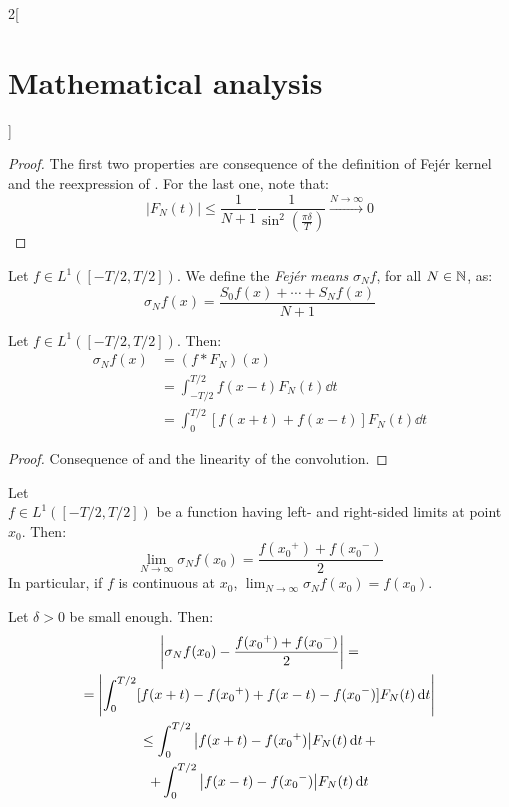 \documentclass[../../../main_math.tex]{subfiles}
\begin{document}
\begin{multicols}{2}[\section{Mathematical analysis}]
\begin{proposition}
  \end{proposition}
  \begin{proof}
    The first two properties are consequence of the definition of Fejér kernel and the reexpression of . For the last one, note that:
    $$|F_N(t)|\leq \frac{1}{N+1}\frac{1}{\sin^2\left(\frac{\pi \delta}{T}\right)}\overset{N\to\infty}{\longrightarrow} 0$$
  \end{proof}
  \begin{definition}
    Let $f\in L^1([-T/2,T/2])$. We define the \emph{Fejér means} $\sigma_Nf$, for all $N\in\mathbb{N} $, as:
    \begin{equation}\label{MA:fejermeans}
      \sigma_Nf(x)=\frac{S_0f(x)+\cdots+S_Nf(x)}{N+1}
    \end{equation}
  \end{definition}
  \begin{proposition}
    Let $f\in L^1([-T/2,T/2])$. Then:
    \begin{align*}
      \sigma_Nf(x) & =(f*F_N)(x)                              \\
                   & =\int_{-T/2}^{T/2}f(x-t)F_N(t)\dd{t}     \\
                   & =\int_0^{T/2}[f(x+t)+f(x-t)]F_N(t)\dd{t}
    \end{align*}
  \end{proposition}
  \begin{proof}
    Consequence of  and the linearity of the convolution.
  \end{proof}
  \begin{theorem}\label{MA:fejerthm0}
    Let \\$f\in L^1([-T/2,T/2])$ be a function having left- and right-sided limits at point $x_0$. Then: $$\lim_{N\to\infty}\sigma_Nf(x_0)=\frac{f({x_0}^+)+f({x_0}^-)}{2}$$ In particular, if $f$ is continuous at $x_0$, $\displaystyle\lim_{N\to\infty}\sigma_Nf(x_0)=f(x_0).$
  \end{theorem}
  \begin{sproof}
    Let $\delta>0$ be small enough. Then:
    \begin{multline*}
      \abs{\sigma_Nf(x_0)-\frac{f({x_0}^+)+f({x_0}^-)}{2}}=\\
      =\abs{\int_0^{T/2}[f(x+t)-f({x_0}^+)+f(x-t)-f({x_0}^-)]F_N(t)\dd{t}} \\
      \leq \int_0^{T/2}\abs{f(x+t)-f({x_0}^+)}F_N(t)\dd{t}+\\+\int_0^{T/2}\abs{f(x-t)-f({x_0}^-)}F_N(t)\dd{t}

\end{multline*}
\end{sproof}
\end{multicols}
\end{document}
